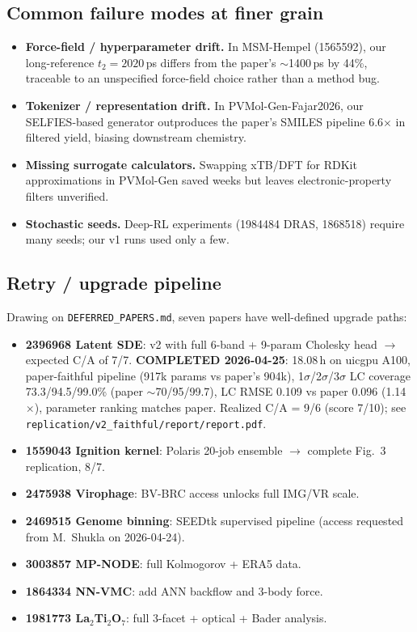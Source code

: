 \documentclass[11pt]{article}
\begin{document}
\subsection{Common failure modes at finer grain}
\begin{itemize}
\item \textbf{Force-field / hyperparameter drift.} In MSM-Hempel (1565592),
our long-reference $t_2=2020$\,ps differs from the paper's $\sim$1400\,ps by
44\%, traceable to an unspecified force-field choice rather than a method bug.
\item \textbf{Tokenizer / representation drift.} In PVMol-Gen-Fajar2026, our
SELFIES-based generator outproduces the paper's SMILES pipeline 6.6$\times$ in
filtered yield, biasing downstream chemistry.
\item \textbf{Missing surrogate calculators.} Swapping xTB/DFT for RDKit
approximations in PVMol-Gen saved weeks but leaves electronic-property filters
unverified.
\item \textbf{Stochastic seeds.} Deep-RL experiments (1984484 DRAS, 1868518)
require many seeds; our v1 runs used only a few.
\end{itemize}

\subsection{Retry / upgrade pipeline}
Drawing on \texttt{DEFERRED\_PAPERS.md}, seven papers have well-defined
upgrade paths:
\begin{itemize}
\item \textbf{2396968 Latent SDE}: v2 with full 6-band + 9-param Cholesky
head $\rightarrow$ expected C/A of 7/7. \textbf{COMPLETED 2026-04-25}: 18.08\,h
on uicgpu A100, paper-faithful pipeline (917k params vs paper's 904k),
1$\sigma$/2$\sigma$/3$\sigma$ LC coverage 73.3/94.5/99.0\% (paper $\sim$70/95/99.7),
LC RMSE 0.109 vs paper 0.096 (1.14$\times$), parameter ranking matches paper.
Realized C/A = 9/6 (score 7/10); see \texttt{replication/v2\_faithful/report/report.pdf}.
\item \textbf{1559043 Ignition kernel}: Polaris 20-job ensemble $\rightarrow$
complete Fig.~3 replication, 8/7.
\item \textbf{2475938 Virophage}: BV-BRC access unlocks full IMG/VR scale.
\item \textbf{2469515 Genome binning}: SEEDtk supervised pipeline (access
requested from M.~Shukla on 2026-04-24).
\item \textbf{3003857 MP-NODE}: full Kolmogorov + ERA5 data.
\item \textbf{1864334 NN-VMC}: add ANN backflow and 3-body force.
\item \textbf{1981773 La$_2$Ti$_2$O$_7$}: full 3-facet + optical + Bader
analysis.
\end{itemize}
\end{document}

